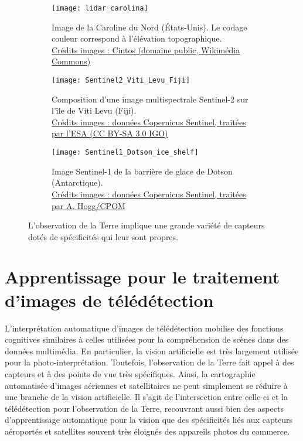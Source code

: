 \begin{figure}[h]
  \captionsetup[subfigure]{width=0.95\linewidth,justification=centering}
  \begin{subfigure}[t]{0.33\textwidth}
    \texttt{[image: lidar\_carolina]}
    \caption{Image  de la Caroline du Nord (États-Unis). Le codage couleur correspond à l'élévation topographique.\\
    \small \href{https://commons.wikimedia.org/wiki/File:Rex,_NC_LiDAR_DEM_of_Carolina_bays.jpg}{Crédits images : Cintos (domaine public, Wikimédia Commons)}
    }
  \end{subfigure}
  \begin{subfigure}[t]{0.33\textwidth}
    \texttt{[image: Sentinel2\_Viti\_Levu\_Fiji]}
    \caption{Composition  d'une image multispectrale Sentinel-2 sur l'île de Viti Levu (Fiji).\\
    \small \href{https://www.esa.int/spaceinimages/Images/2017/11/Viti_Levu_Fiji}{Crédits images : données Copernicus Sentinel, traitées par l'ESA (CC BY-SA 3.0 IGO)}
    }
  \end{subfigure}
  \begin{subfigure}[t]{0.33\textwidth}
    \texttt{[image: Sentinel1\_Dotson\_ice\_shelf]}
    \caption{Image  Sentinel-1 de la barrière de glace de Dotson (Antarctique).\\
    \small \href{https://www.esa.int/spaceinimages/Images/2017/10/Dotson_ice_shelf_from_Sentinel-1}{Crédits images : données Copernicus Sentinel, traitées par A. Hogg/CPOM}
    }
  \end{subfigure}
  \caption{L'observation de la Terre implique une grande variété de capteurs dotés de spécificités qui leur sont propres.}
  \label{fig:earth_observation}
\end{figure}

\section{Apprentissage pour le traitement d'images de télédétection}

L'interprétation automatique d'images de télédétection mobilise des fonctions cognitives similaires à celles utilisées pour la compréhension de scènes dans des données multimédia. En particulier, la vision artificielle est très largement utilisée pour la photo-interprétation. Toutefois, l'observation de la Terre fait appel à des capteurs et à des points de vue très spécifiques. Ainsi, la cartographie automatisée d'images aériennes et satellitaires ne peut simplement se réduire à une branche de la vision artificielle. Il s'agit de l'intersection entre celle-ci et la télédétection pour l'observation de la Terre, recouvrant aussi bien des aspects d'apprentissage automatique pour la vision que des spécificités liés aux capteurs aéroportés et satellites souvent très éloignés des appareils photos du commerce.

